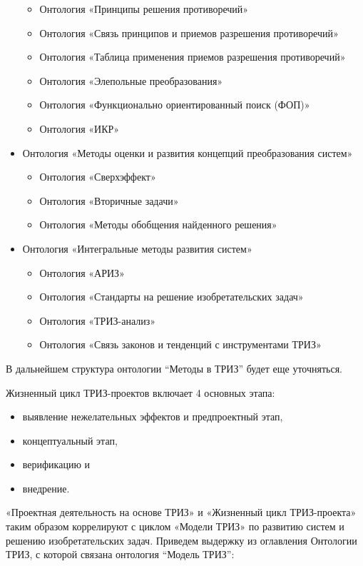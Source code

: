 \documentclass[11pt,a4paper]{article}
\begin{document}
\begin{itemize}
\begin{itemize}[noitemsep]
  \item Онтология «Принципы решения противоречий»
  \item Онтология «Связь принципов и приемов разрешения противоречий»
  \item Онтология «Таблица применения приемов разрешения противоречий»
  \item Онтология «Элепольные преобразования»
  \item Онтология «Функционально ориентированный поиск (ФОП)»
  \item Онтология «ИКР»
  \end{itemize}
\item Онтология «Методы оценки и развития концепций преобразования систем»
  \begin{itemize}[noitemsep]
  \item Онтология «Сверхэффект»
  \item Онтология «Вторичные задачи»
  \item Онтология «Методы обобщения найденного решения»
  \end{itemize}
\item Онтология «Интегральные методы развития систем»
  \begin{itemize}[noitemsep]
  \item Онтология «АРИЗ»
  \item Онтология «Стандарты на решение изобретательских задач»
  \item Онтология «ТРИЗ-анализ»
  \item Онтология «Связь законов и тенденций с инструментами ТРИЗ»
  \end{itemize}
\end{itemize}
В дальнейшем структура онтологии “Методы в ТРИЗ” будет еще уточняться.

Жизненный цикл ТРИЗ-проектов включает 4 основных этапа:
\begin{itemize}[noitemsep]
\item выявление нежелательных эффектов и предпроектный этап,
\item концептуальный этап,
\item верификацию и
\item внедрение.
\end{itemize}
«Проектная деятельность на основе ТРИЗ» и «Жизненный цикл ТРИЗ-проекта» таким
образом коррелируют с циклом «Модели ТРИЗ» по развитию систем и решению
изобретательских задач. Приведем выдержку из оглавления Онтологии ТРИЗ, с
которой связана онтология “Модель ТРИЗ”:
\end{document}
